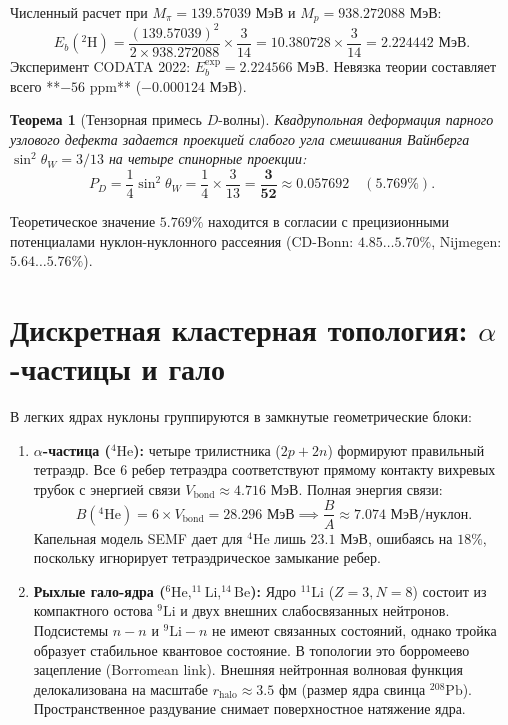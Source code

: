 \documentclass[11pt,a4paper]{article}
\newtheorem{theorem}{Теорема}
\theoremstyle{definition}
\theoremstyle{remark}
\begin{document}
Численный расчет при $M_\pi = 139.57039\text{ МэВ}$ и $M_p = 938.272088\text{ МэВ}$:
\begin{equation}
    E_b(^2\mathrm{H}) = \frac{(139.57039)^2}{2 \times 938.272088} \times \frac{3}{14} = 10.380728 \times \frac{3}{14} = \mathbf{2.224442\text{ МэВ}}.
\end{equation}
Эксперимент CODATA 2022: $E_b^{\mathrm{exp}} = 2.224566\text{ МэВ}$. Невязка теории составляет всего **$-56\text{ ppm}$** ($-0.000124\text{ МэВ}$).

\begin{theorem}[Тензорная примесь $D$-волны]
Квадрупольная деформация парного узлового дефекта задается проекцией слабого угла смешивания Вайнберга $\sin^2\theta_W = 3/13$ на четыре спинорные проекции:
\begin{equation}
    P_D = \frac{1}{4} \sin^2\theta_W = \frac{1}{4} \times \frac{3}{13} = \boldsymbol{\frac{3}{52}} \approx 0.057692 \quad (5.769\%).
\end{equation}
\end{theorem}
Теоретическое значение $5.769\%$ находится в согласии с прецизионными потенциалами нуклон-нуклонного рассеяния (CD-Bonn: $4.85\dots 5.70\%$, Nijmegen: $5.64\dots 5.76\%$).

\section{Дискретная кластерная топология: $\alpha$-частицы и гало}
В легких ядрах нуклоны группируются в замкнутые геометрические блоки:
\begin{enumerate}
    \item \textbf{$\alpha$-частица ($^4\mathrm{He}$):} четыре трилистника ($2p + 2n$) формируют правильный тетраэдр. Все 6 ребер тетраэдра соответствуют прямому контакту вихревых трубок с энергией связи $V_{\mathrm{bond}} \approx 4.716\text{ МэВ}$. Полная энергия связи:
    \begin{equation}
        B(^4\mathrm{He}) = 6 \times V_{\mathrm{bond}} = \mathbf{28.296\text{ МэВ}} \implies \frac{B}{A} \approx 7.074\text{ МэВ/нуклон}.
    \end{equation}
    Капельная модель SEMF дает для $^4\mathrm{He}$ лишь $23.1\text{ МэВ}$, ошибаясь на $18\%$, поскольку игнорирует тетраэдрическое замыкание ребер.
    \item \textbf{Рыхлые гало-ядра ($^6\mathrm{He}, ^{11}\mathrm{Li}, ^{14}\mathrm{Be}$):}
    Ядро $^{11}\mathrm{Li}$ ($Z=3, N=8$) состоит из компактного остова $^9\mathrm{Li}$ и двух внешних слабосвязанных нейтронов. Подсистемы $n-n$ и $^9\mathrm{Li}-n$ не имеют связанных состояний, однако тройка образует стабильное квантовое состояние. В топологии это борромеево зацепление (Borromean link). Внешняя нейтронная волновая функция делокализована на масштабе $r_{\mathrm{halo}} \approx 3.5\text{ фм}$ (размер ядра свинца $^{208}\mathrm{Pb}$). Пространственное раздувание снимает поверхностное натяжение ядра.
\end{enumerate}
\end{document}
